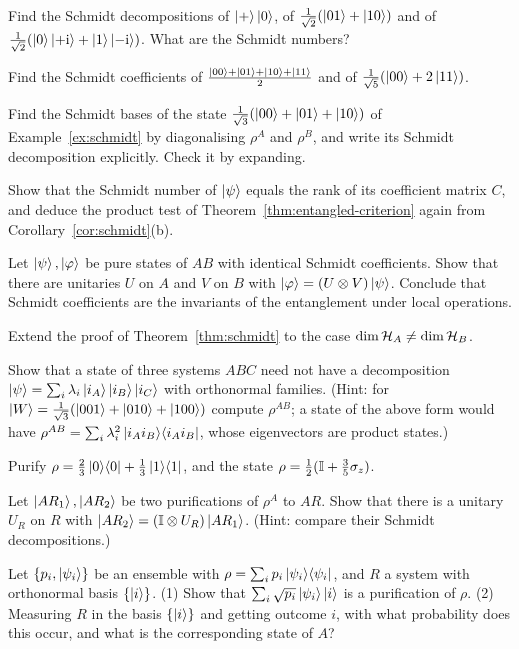 \begin{exerciseset}
   Find the Schmidt decompositions of $\left|+\right\rangle\left|0\right\rangle$, of $\frac{1}{\sqrt2}(\left|01\right\rangle+\left|10\right\rangle)$ and of $\frac1{\sqrt2}(\left|0\right\rangle\left|+\mathrm{i}\right\rangle+\left|1\right\rangle\left|-\mathrm{i}\right\rangle)$. What are the Schmidt numbers?

   Find the Schmidt coefficients of $\frac{\left|00\right\rangle+\left|01\right\rangle+\left|10\right\rangle+\left|11\right\rangle}2$ and of $\frac1{\sqrt{5}}(\left|00\right\rangle+2\left|11\right\rangle)$.

   Find the Schmidt bases of the state $\frac1{\sqrt3}(\left|00\right\rangle+\left|01\right\rangle+\left|10\right\rangle)$ of Example~\ref{ex:schmidt} by diagonalising $\rho^A$ and $\rho^B$, and write its Schmidt decomposition explicitly. Check it by expanding.

   Show that the Schmidt number of $\left|\psi\right\rangle$ equals the rank of its coefficient matrix $C$, and deduce the product test of Theorem~\ref{thm:entangled-criterion} again from Corollary~\ref{cor:schmidt}(b).

   Let $\left|\psi\right\rangle,\left|\varphi\right\rangle$ be pure states of $AB$ with identical Schmidt coefficients. Show that there are unitaries $U$ on $A$ and $V$ on $B$ with $\left|\varphi\right\rangle=(U\otimes V)\left|\psi\right\rangle$. Conclude that Schmidt coefficients are the invariants of the entanglement under local operations.

   Extend the proof of Theorem~\ref{thm:schmidt} to the case $\dim\mathcal{H}_A\neq\dim\mathcal{H}_B$.

   Show that a state of three systems $ABC$ need not have a decomposition $\left|\psi\right\rangle=\sum_i\lambda_i\left|i_A\right\rangle\left|i_B\right\rangle\left|i_C\right\rangle$ with orthonormal families. (Hint: for $\left|W\right\rangle=\frac1{\sqrt3}(\left|001\right\rangle+\left|010\right\rangle+\left|100\right\rangle)$ compute $\rho^{AB}$; a state of the above form would have $\rho^{AB}=\sum_i\lambda_i^2\left|i_Ai_B\right\rangle\!\left\langle i_Ai_B\right|$, whose eigenvectors are product states.)

   Purify $\rho=\tfrac23\left|0\right\rangle\!\left\langle0\right|+\tfrac13\left|1\right\rangle\!\left\langle1\right|$, and the state $\rho=\tfrac12(\mathbb{I}+\tfrac35\sigma_z)$.

   Let $\left|AR_1\right\rangle,\left|AR_2\right\rangle$ be two purifications of $\rho^A$ to $AR$. Show that there is a unitary $U_R$ on $R$ with $\left|AR_2\right\rangle=(\mathbb{I}\otimes U_R)\left|AR_1\right\rangle$. (Hint: compare their Schmidt decompositions.)\label{ex:purif-freedom}

   Let $\{p_i,\left|\psi_i\right\rangle\}$ be an ensemble with $\rho=\sum_ip_i\left|\psi_i\right\rangle\!\left\langle\psi_i\right|$, and $R$ a system with orthonormal basis $\{\left|i\right\rangle\}$. (1) Show that $\sum_i\sqrt{p_i}\left|\psi_i\right\rangle\left|i\right\rangle$ is a purification of $\rho$. (2) Measuring $R$ in the basis $\{\left|i\right\rangle\}$ and getting outcome $i$, with what probability does this occur, and what is the corresponding state of $A$?\label{ex:ensemble-purif}
\end{exerciseset}
